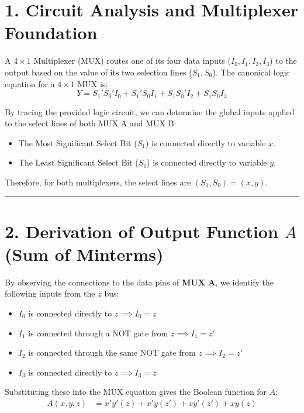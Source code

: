 \documentclass[12pt,a3paper]{article}
\begin{document}
\begin{enumerate}
\begin{tcolorbox}[enhanced,breakable,ansbox,colback=cB!4,colframe=cB,boxrule=0.8pt,arc=5pt,title={\textbf{Answer}},fonttitle=\bfseries\color{white},colbacktitle=cB]
\section*{1. Circuit Analysis and Multiplexer Foundation}

A $4 \times 1$ Multiplexer (MUX) routes one of its four data inputs ($I_0, I_1, I_2, I_3$) to the output based on the value of its two selection lines ($S_1, S_0$). The canonical logic equation for a $4 \times 1$ MUX is:
\begin{equation}
    Y = S_1' S_0' I_0 + S_1' S_0 I_1 + S_1 S_0' I_2 + S_1 S_0 I_3
\end{equation}

By tracing the provided logic circuit, we can determine the global inputs applied to the select lines of both MUX A and MUX B:
\begin{itemize}
    \item The Most Significant Select Bit (\textbf{$S_1$}) is connected directly to variable \textbf{$x$}.
    \item The Least Significant Select Bit (\textbf{$S_0$}) is connected directly to variable \textbf{$y$}.
\end{itemize}
Therefore, for both multiplexers, the select lines are $(S_1, S_0) = (x, y)$.

\vspace{0.2cm}
\hrule
\vspace{0.4cm}

\section*{2. Derivation of Output Function $A$ (Sum of Minterms)}

By observing the connections to the data pins of \textbf{MUX A}, we identify the following inputs from the $z$ bus:
\begin{itemize}
    \item $I_0$ is connected directly to $z \implies I_0 = z$
    \item $I_1$ is connected through a NOT gate from $z \implies I_1 = z'$
    \item $I_2$ is connected through the same NOT gate from $z \implies I_2 = z'$
    \item $I_3$ is connected directly to $z \implies I_3 = z$
\end{itemize}

Substituting these into the MUX equation gives the Boolean function for $A$:
\begin{align*}
    A(x,y,z) &= x'y'(z) + x'y(z') + xy'(z') + xy(z)
\end{align*}


\end{tcolorbox}
\end{enumerate}
\end{document}
